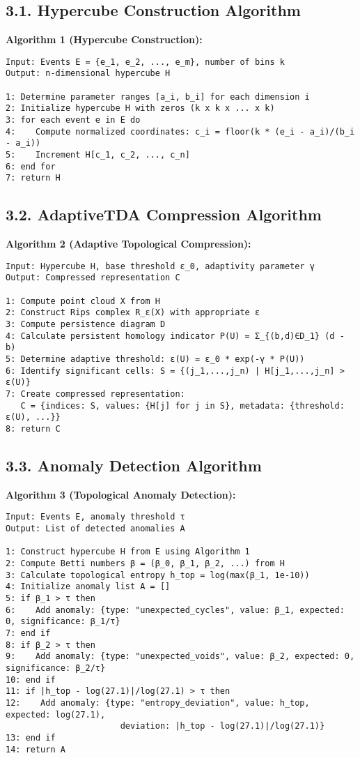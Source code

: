\documentclass[12pt]{article}
\begin{document}
\subsection*{3.1. Hypercube Construction Algorithm}
\textbf{Algorithm 1 (Hypercube Construction):}

\begin{verbatim}
Input: Events E = {e_1, e_2, ..., e_m}, number of bins k
Output: n-dimensional hypercube H

1: Determine parameter ranges [a_i, b_i] for each dimension i
2: Initialize hypercube H with zeros (k x k x ... x k)
3: for each event e in E do
4:    Compute normalized coordinates: c_i = floor(k * (e_i - a_i)/(b_i - a_i))
5:    Increment H[c_1, c_2, ..., c_n]
6: end for
7: return H
\end{verbatim}

\subsection*{3.2. AdaptiveTDA Compression Algorithm}
\textbf{Algorithm 2 (Adaptive Topological Compression):}

\begin{verbatim}
Input: Hypercube H, base threshold ε_0, adaptivity parameter γ
Output: Compressed representation C

1: Compute point cloud X from H
2: Construct Rips complex R_ε(X) with appropriate ε
3: Compute persistence diagram D
4: Calculate persistent homology indicator P(U) = Σ_{(b,d)∈D_1} (d - b)
5: Determine adaptive threshold: ε(U) = ε_0 * exp(-γ * P(U))
6: Identify significant cells: S = {(j_1,...,j_n) | H[j_1,...,j_n] > ε(U)}
7: Create compressed representation:
   C = {indices: S, values: {H[j] for j in S}, metadata: {threshold: ε(U), ...}}
8: return C
\end{verbatim}

\subsection*{3.3. Anomaly Detection Algorithm}
\textbf{Algorithm 3 (Topological Anomaly Detection):}

\begin{verbatim}
Input: Events E, anomaly threshold τ
Output: List of detected anomalies A

1: Construct hypercube H from E using Algorithm 1
2: Compute Betti numbers β = (β_0, β_1, β_2, ...) from H
3: Calculate topological entropy h_top = log(max(β_1, 1e-10))
4: Initialize anomaly list A = []
5: if β_1 > τ then
6:    Add anomaly: {type: "unexpected_cycles", value: β_1, expected: 0, significance: β_1/τ}
7: end if
8: if β_2 > τ then
9:    Add anomaly: {type: "unexpected_voids", value: β_2, expected: 0, significance: β_2/τ}
10: end if
11: if |h_top - log(27.1)|/log(27.1) > τ then
12:    Add anomaly: {type: "entropy_deviation", value: h_top, expected: log(27.1), 
                       deviation: |h_top - log(27.1)|/log(27.1)}
13: end if
14: return A
\end{verbatim}
\end{document}
